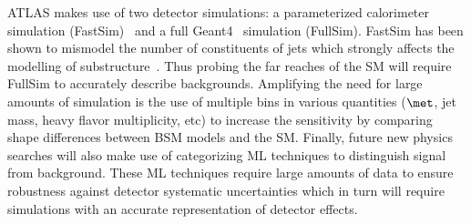 \documentclass[letter, USenglish, 11pt]{article}
\begin{document}
ATLAS makes use of two detector simulations: a parameterized calorimeter simulation (FastSim)~\cite{ATL-SOFT-PUB-2018-002} and a full Geant4~\cite{Agostinelli:2002hh} simulation (FullSim). FastSim has been shown to mismodel the number of constituents of jets which strongly affects the modelling of substructure~\cite{ATL-SOFT-PUB-2018-002}. Thus probing the far reaches of the SM will require  FullSim to accurately describe backgrounds. Amplifying the need for large amounts of simulation is the use of multiple bins in various quantities ($\met$, jet mass, heavy flavor multiplicity, etc) to increase the sensitivity by comparing shape differences between BSM models and the SM. Finally, future new physics searches will also make use of categorizing ML techniques to distinguish signal from background. These ML techniques require large amounts of data to ensure robustness against detector systematic uncertainties which in turn will require simulations with an accurate representation of detector effects.


\end{document}
